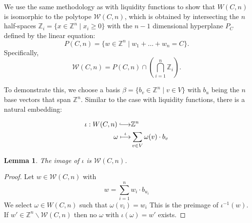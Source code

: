 \documentclass[10pt,twocolumn]{article}
\newtheorem{lemma}[theorem]{Lemma}
\newcommand{\longhookrightarrow}{\lhook\joinrel\longrightarrow}
\begin{document}
We use the same methodology as with liquidity functions to show that \( W(C,n) \) is isomorphic to the polytope \( \mathcal{W}(C,n) \), which is obtained by intersecting the \( n \) half-spaces \( \mathbb{Z}_i = \{x \in \mathbb{Z}^n \mid x_i \geq 0\} \) with the \( n-1 \) dimensional hyperplane \( P_C \) defined by the linear equation:
$$
P(C,n) = \{w \in \mathbb{Z}^n \mid w_1 + \dots + w_n = C\}.
$$
Specifically,
$$
\mathcal{W}(C,n) = P(C,n) \cap \left( \bigcap_{i=1}^n \mathbb{Z}_i \right).
$$

To demonstrate this, we choose a basis \( \beta = \{b_{v} \in \mathbb{Z}^{n} \mid v \in V\} \) with \( b_{u} \) being the \( n \) base vectors that span \( \mathbb{Z}^{n} \). Similar to the case with liquidity functions, there is a natural embedding:

\begin{equation*}
  \begin{split}
\iota: W(C,n) \longhookrightarrow & \mathbb{Z}^{n} \\
\omega\stackrel{\iota}{\longmapsto} & \sum_{v\in V}\omega(v)\cdot b_{v}
\end{split}
\end{equation*}

\begin{lemma}
  The image of $\iota$ is $\mathcal{W}(C,n)$.
\end{lemma}
\begin{proof}
  Let $w\in \mathcal{W}(C,n)$ with
  $$w = \sum_{i=1}^nw_i\cdot b_{u_i}$$
  We select $\omega\in W(C,n)$ such that $\omega(v_i)=w_i$
  This is the preimage of $\iota^{-1}(w)$.
  If $w'\in \mathbb{Z}^n\backslash\mathcal{W}(C,n)$ then no $\omega$ with $\iota(\omega)=w'$ exists.
\end{proof}



\end{document}
